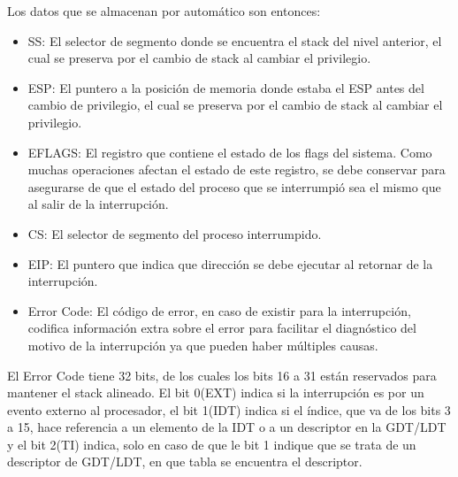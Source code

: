 \documentclass[10pt, a4paper]{article}
\begin{document}
Los datos que se almacenan por automático son entonces:
\begin{itemize}
	\item SS: El selector de segmento donde se encuentra el stack del nivel anterior, el cual se preserva por el cambio de stack al cambiar el privilegio.
	\item ESP: El puntero a la posición de memoria donde estaba el ESP antes del cambio de privilegio, el cual se preserva por el cambio de stack al cambiar el privilegio.
	\item EFLAGS: El registro que contiene el estado de los flags del sistema. Como muchas operaciones afectan el estado de este registro, se debe conservar para asegurarse de que el estado del proceso que se interrumpió sea el mismo que al salir de la interrupción.
	\item CS: El selector de segmento del proceso interrumpido.
	\item EIP: El puntero que indica que dirección se debe ejecutar al retornar de la interrupción.
	\item Error Code: El código de error, en caso de existir para la interrupci\'on, codifica información extra sobre el error para facilitar el diagn\'ostico del motivo de la interrupci\'on ya que pueden haber m\'ultiples causas.
\end{itemize}

El Error Code tiene 32 bits, de los cuales los bits 16 a 31 están reservados para mantener el stack alineado. El bit 0(EXT) indica si la interrupción es por un evento externo al procesador, el bit 1(IDT) indica si el índice, que va de los bits 3 a 15, hace referencia a un elemento de la IDT o a un descriptor en la GDT/LDT y el bit 2(TI) indica, solo en caso de que le bit 1 indique que se trata de un descriptor de GDT/LDT, en que tabla se encuentra el descriptor.
\end{document}

